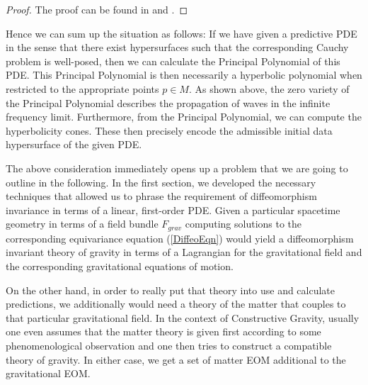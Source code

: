 \begin{proof}
The proof can be found in \cite{Hormander1977} and \cite{Ivrii_1974}.
\end{proof}
Hence we can sum up the situation as follows: If we have given a predictive PDE in the sense that there exist hypersurfaces such that the corresponding Cauchy problem is well-posed, then we can calculate the Principal Polynomial of this PDE. This Principal Polynomial is then necessarily a hyperbolic polynomial when restricted to the appropriate points $p \in M$. As shown above, the zero variety of the Principal Polynomial describes the propagation of waves in the infinite frequency limit. Furthermore, from the Principal Polynomial, we can compute the hyperbolicity cones. These then precisely encode the admissible initial data hypersurface of the given PDE.

The above consideration immediately opens up a problem that we are going to outline in the following. In the first section, we developed the necessary techniques that allowed us to phrase the requirement of diffeomorphism invariance in terms of a linear, first-order PDE. Given a particular spacetime geometry in terms of a field bundle $F_{grav}$ computing solutions to the corresponding equivariance equation (\ref{DiffeoEqn}) would yield a diffeomorphism invariant theory of gravity in terms of a Lagrangian for the gravitational field and the corresponding gravitational equations of motion.  

On the other hand, in order to really put that theory into use and calculate predictions, we additionally would need a theory of the matter that couples to that particular gravitational field. In the context of Constructive Gravity, usually one even assumes that the matter theory is given first according to some phenomenological observation and one then tries to construct a compatible theory of gravity. In either case, we get a set of matter EOM additional to the gravitational EOM.

